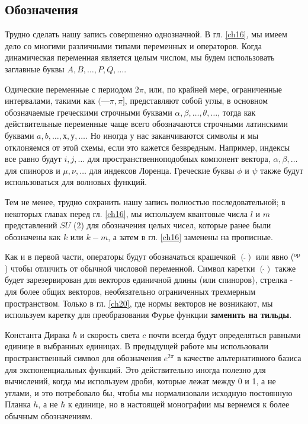 \documentclass[main.tex]{subfiles}
\begin{document}
\subsection{Обозначения}\label{ch11.2}

Трудно сделать нашу запись совершенно однозначной. В гл. \ref{ch16}, мы имеем дело со многими различными типами переменных и операторов. Когда динамическая переменная является целым числом, мы будем использовать заглавные буквы $A, B, \ldots, P, Q,\ldots$.             

Одические переменные с периодом $2\pi$, или, по крайней мере, ограниченные интервалами, такими как $(—\pi, \pi]$, представляют собой углы, в основном обозначаемые греческими строчными буквами $\alpha, \beta, \ldots, \theta, \ldots$, тогда как действительные переменные чаще всего обозначаются строчными латинскими буквами $a, b,\ldots, х, у, \ldots$. Но иногда у нас заканчиваются символы и мы отклоняемся от этой схемы, если это кажется безвредным. Например, индексы все равно будут $i, j,\ldots$ для пространственноподобных компонент вектора, $\alpha, \beta,\ldots$ для спиноров и $\mu, \nu, \ldots$ для индексов Лоренца. Греческие буквы $\phi$ и $\psi$ также будут использоваться для волновых функций.

Тем не менее, трудно сохранить нашу запись полностью последовательной; в некоторых главах перед гл. \ref{ch16}, мы используем квантовые числа $l$ и $m$ представлений $SU$ (2) для обозначения целых чисел, которые ранее были обозначены как $k$ или $k - m$, а затем в гл. \ref{ch16} заменены на прописные.

Как и в первой части, операторы будут обозначаться крашечкой $(\hat{ } )$ или явно ($ ^\mathrm{op}$) чтобы отличить от обычной числовой переменной. Символ каретки $(\hat{ } )$ также будет зарезервирован для векторов единичной длины (или спиноров), стрелка - для более общих векторов, необязательно ограниченных трехмерным пространством. Только в гл. \ref{ch20}, где нормы векторов не возникают, мы используем каретку для преобразования Фурье функции \textbf{заменить на тильды}.

Константа Дирака $\hbar$ и скорость света $c$ почти всегда будут определяться равными единице в выбранных единицах. В предыдущей работе мы использовали пространственный символ для обозначения $e^{2\pi}$ в качестве альтернативного базиса для экспоненциальных функций. Это действительно иногда полезно для вычислений, когда мы используем дроби, которые лежат между 0 и 1, а не углами, и это потребовало бы, чтобы мы нормализовали исходную постоянную Планка $h$, а не $\hbar$ к единице, но в настоящей монографии мы вернемся к более обычным обозначениям.
\end{document}
